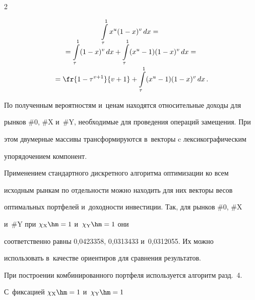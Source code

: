 \begin{multicols}{2}
\vspace*{-12pt}





\noindent


  \begin{multline*}


  \int\limits^1_\tau x^u(1-x)^v \,dx={}\\[-12pt]


  {}=\int\limits_\tau^1(1-x)^v \,dx+\int\limits_\tau^1 


(x^u-1)(1-x)^v \,dx={}\\[-2pt]


  {}=\fr{1-\tau^{v+1}}{v+1} +\int\limits^1_\tau (x^u-1)(1-x)^v \,dx\,.


  \end{multline*}


  


  \vspace*{-12pt}


  


  По полученным вероятностям и~ценам находятся относительные доходы для 


рынков \#0, \#X и~\#Y, необходимые для проведения операций замещения. При 


этом двумерные массивы трансформируются в~векторы c лексикографическим 


упорядочением компонент.


  


  Применением стандартного дискретного алгоритма оптимизации ко всем 


исходным рынкам по отдельности можно находить для них векторы весов 


оптимальных портфелей и~доходности инвестиции. Так, для рынков \#0, \#X 


и~\#Y при $\chi_{\mathrm{X}}\hm=1$ и~$\chi_{\mathrm{Y}}\hm=1$ они 


соответственно равны 0{,}0423358, 0{,}0313433 и~0{,}0312055. Их можно 


использовать в~качестве ориентиров для сравнения результатов. 


  


  


  При построении комбинированного портфеля используется алгоритм разд.~4. 


С~фиксацией $\chi_{\mathrm{X}}\hm=1$ и~$\chi_{\mathrm{Y}}\hm=1$ 



\end{multicols}
